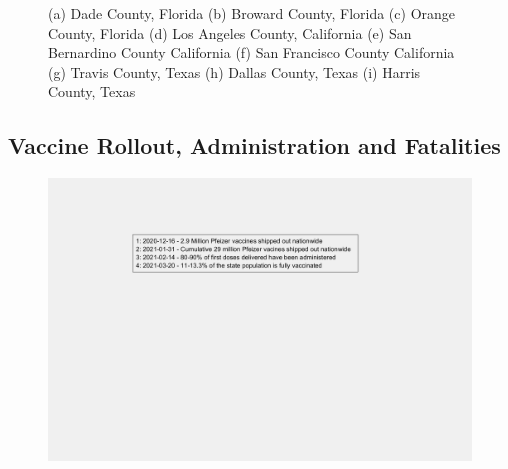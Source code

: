 \documentclass[]{article}
\begin{document}
\begin{figure}
	\caption{(a) Dade County, Florida (b) Broward County, Florida (c) Orange County, Florida (d) Los Angeles County, California (e) San Bernardino County California (f) San Francisco County California (g) Travis County, Texas (h) Dallas County, Texas (i) Harris County, Texas}
	\label{fig:foobar}
\end{figure}
\FloatBarrier
\vspace{5mm}

\subsection{Vaccine Rollout, Administration and Fatalities}

\begin{figure}[!h]
	\includegraphics[width=\linewidth]{legends/vaccine_rollout_legend.png}
	\caption{}
	\label{fig:legends/vaccine_rollout_legendLabel}
\end{figure}
\end{document}
